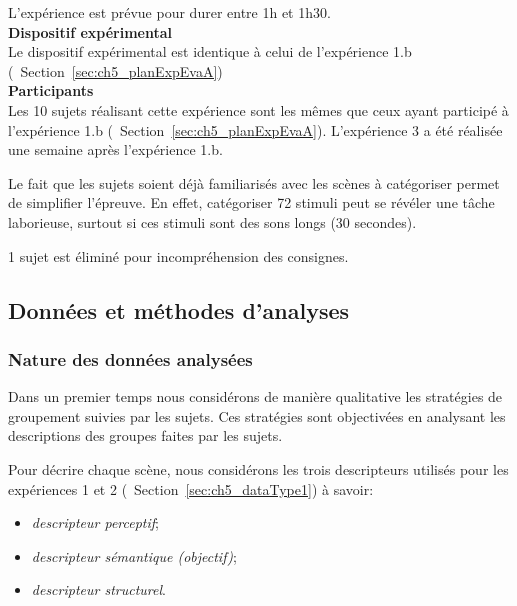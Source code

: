 L'expérience est prévue pour durer entre 1h et 1h30. \\

{\setlength{\parindent}{0cm}\textbf{Dispositif expérimental}} \\

Le dispositif expérimental est identique à celui de l'expérience 1.b (\cf~Section~\ref{sec:ch5_planExpEvaA}) \\

{\setlength{\parindent}{0cm}\textbf{Participants}} \\

Les 10 sujets réalisant cette expérience sont les mêmes que ceux ayant participé à l'expérience 1.b (\cf~Section~\ref{sec:ch5_planExpEvaA}). L'expérience 3 a été réalisée une semaine après l'expérience 1.b. 

Le fait que les sujets soient déjà familiarisés avec les scènes à catégoriser permet de simplifier l'épreuve. En effet, catégoriser 72 stimuli peut se révéler une tâche laborieuse, surtout si ces stimuli sont des sons longs (30 secondes).

1 sujet est éliminé pour incompréhension des consignes.

\subsection{Données et méthodes d'analyses}

\subsubsection{Nature des données analysées}
\label{sec:ch5_dataXp3}

Dans un premier temps nous considérons de manière qualitative les stratégies de groupement suivies par les sujets. Ces stratégies sont objectivées en analysant les descriptions des groupes faites par les sujets.

Pour décrire chaque scène, nous considérons les trois descripteurs utilisés pour les expériences 1 et 2 (\cf~Section~\ref{sec:ch5_dataType1}) à savoir:

\begin{itemize}
\item \emph{descripteur perceptif};
\item \emph{descripteur sémantique (objectif)};
\item \emph{descripteur structurel}.
\end{itemize}

  

